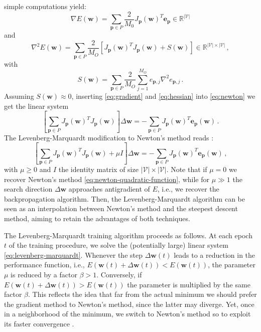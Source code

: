 \documentclass[12pt, a4paper, twoside, openright, notitlepage]{report}
\numberwithin{equation}{chapter}
\theoremstyle{theorem}
\theoremstyle{definition}
\theoremstyle{remark}
\theoremstyle{proposition}
\numberwithin{figure}{chapter}
\begin{document}
		simple computations yield:
		\begin{equation}
			\label{eq:gradient}
			\nabla E(\mathbf{w}) = \sum_{\mathbf{p} \in P} \dfrac{2}{M_0} J_{\mathbf{p}}(\mathbf{w})^T \mathbf{e}_{\mathbf{p}} \in \mathbb{R}^{|\mathcal{V}|}
		\end{equation}
		and
		\begin{equation}
			\label{eq:hessian}
			\nabla^2 E(\mathbf{w}) = \sum_{\mathbf{p} \in P} \dfrac{2}{M_O} \left[ J_{\mathbf{p}}(\mathbf{w})^T J_{\mathbf{p}}(\mathbf{w}) + S(\mathbf{w}) \right] \in \mathbb{R}^{|\mathcal{V}| \times |\mathcal{V}|} \, ,
		\end{equation}
		with
		\begin{equation*}
			S(\mathbf{w}) = \sum_{\mathbf{p} \in P} \dfrac{2}{M_O} \sum_{j = 1}^{M_O} e_{\mathbf{p},j} \nabla^2 e_{\mathbf{p},j} \, .
		\end{equation*}
		Assuming $S(\mathbf{w}) \approx 0$, inserting \eqref{eq:gradient} and \eqref{eq:hessian} into \eqref{eq:newton} we get the linear system
		\begin{equation}
			\label{eq:newton-quadratic-function}
			\left[ \sum_{\mathbf{p} \in P} J_{\mathbf{p}}(\mathbf{w})^T J_{\mathbf{p}}(\mathbf{w}) \right] \Delta \mathbf{w} = - \sum_{\mathbf{p} \in P} J_{\mathbf{p}}(\mathbf{w})^T \mathbf{e}_{\mathbf{p}}(\mathbf{w}) \, .
		\end{equation} 
		The Levenberg-Marquardt modification to Newton's method reads \cite{Hag94, Mar63}:
		\begin{equation}
			\label{eq:levenberg-marquardt}
			\left[ \sum_{\mathbf{p} \in P} J_{\mathbf{p}}(\mathbf{w})^T J_{\mathbf{p}}(\mathbf{w}) + \mu I \right] \Delta \mathbf{w} = - \sum_{\mathbf{p} \in P} J_{\mathbf{p}}(\mathbf{w})^T \mathbf{e}_{\mathbf{p}}(\mathbf{w}) \, ,
		\end{equation}
		with $\mu \geq 0$ and $I$ the identity matrix of size $|\mathcal{V}| \times |\mathcal{V}|$. Note that if $\mu = 0$ we recover Newton's method \eqref{eq:newton-quadratic-function}, while for $\mu \gg 1$ the search direction $\Delta \mathbf{w}$ approaches antigradient of $E$, i.e., we recover the backpropagation algorithm. Then, the Levenberg-Marquardt algorithm can be seen as an interpolation between Newton's method and the steepest descent method, aiming to retain the advantages of both techniques.
		
		The Levenberg-Marquardt training algorithm proceeds as follows. At each epoch $t$ of the training procedure, we solve the (potentially large) linear system \eqref{eq:levenberg-marquardt}. Whenever the step $\Delta \mathbf{w}(t)$ leads to a reduction in the performance function, i.e., $E(\mathbf{w}(t) + \Delta \mathbf{w}(t)) < E(\mathbf{w}(t))$, the parameter $\mu$ is reduced by a factor $\beta > 1$. Conversely, if $E(\mathbf{w}(t) + \Delta \mathbf{w}(t)) > E(\mathbf{w}(t))$ the parameter is multiplied by the same factor $\beta$. This reflects the idea that far from the actual minimum we should prefer the gradient method to Newton's method, since the latter may diverge. Yet, once in a neighborhood of the minimum, we switch to Newton's method so to exploit its faster convergence \cite{Mar63}.
		
\end{document}
